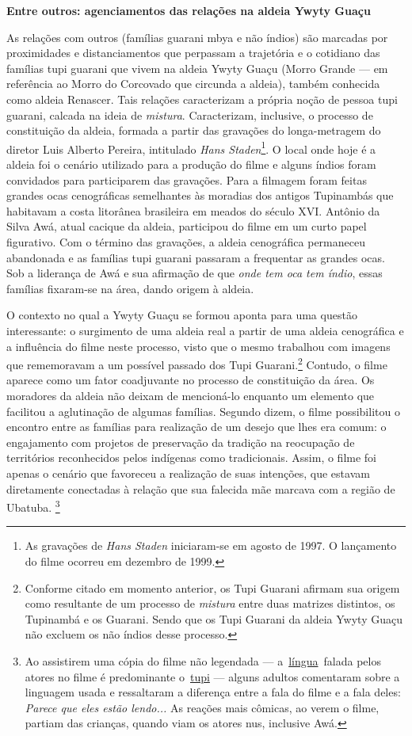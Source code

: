 \textbf{Entre outros: agenciamentos das relações na aldeia Ywyty Guaçu }

As relações com outros (famílias guarani mbya e não índios) são marcadas
por proximidades e distanciamentos que perpassam a trajetória e o
cotidiano das famílias tupi guarani que vivem na aldeia Ywyty Guaçu
(Morro Grande --- em referência ao Morro do Corcovado que circunda a
aldeia), também conhecida como aldeia Renascer. Tais relações
caracterizam a própria noção de pessoa tupi guarani, calcada na ideia de
\emph{mistura}. Caracterizam, inclusive, o processo de constituição da
aldeia, formada a partir das gravações do longa-metragem do diretor Luis
Alberto Pereira, intitulado \emph{Hans Staden}\footnote{As gravações de
  \emph{Hans Staden} iniciaram-se em agosto de 1997. O lançamento do
  filme ocorreu em dezembro de 1999.}. O local onde hoje é a aldeia foi
o cenário utilizado para a produção do filme e alguns índios foram
convidados para participarem das gravações. Para a filmagem foram feitas
grandes ocas cenográficas semelhantes às moradias dos antigos Tupinambás
que habitavam a costa litorânea brasileira em meados do século XVI.
Antônio da Silva Awá, atual cacique da aldeia, participou do filme em um
curto papel figurativo. Com o término das gravações, a aldeia
cenográfica permaneceu abandonada e as famílias tupi guarani passaram a
frequentar as grandes ocas. Sob a liderança de Awá e sua afirmação de
que \emph{onde tem oca tem índio}, essas famílias fixaram-se na área,
dando origem à aldeia.

O contexto no qual a Ywyty Guaçu se formou aponta para uma questão
interessante: o surgimento de uma aldeia real a partir de uma aldeia
cenográfica e a influência do filme neste processo, visto que o mesmo
trabalhou com imagens que rememoravam a um possível passado dos Tupi
Guarani.\footnote{Conforme citado em momento anterior, os Tupi Guarani
  afirmam sua origem como resultante de um processo de \emph{mistura}
  entre duas matrizes distintos, os Tupinambá e os Guarani. Sendo que os
  Tupi Guarani da aldeia Ywyty Guaçu não excluem os não índios desse
  processo.} Contudo, o filme aparece como um fator coadjuvante no
processo de constituição da área. Os moradores da aldeia não deixam de
mencioná-lo enquanto um elemento que facilitou a aglutinação de algumas
famílias. Segundo dizem, o filme possibilitou o encontro entre as
famílias para realização de um desejo que lhes era comum: o engajamento
com projetos de preservação da tradição na reocupação de territórios
reconhecidos pelos indígenas como tradicionais. Assim, o filme foi
apenas o cenário que favoreceu a realização de suas intenções, que
estavam diretamente conectadas à relação que sua falecida mãe marcava
com a região de Ubatuba. \footnote{Ao assistirem uma cópia do filme não
  legendada ---
  a~\href{http://pt.wikipedia.org/wiki/Língua}{língua}~falada pelos
  atores no filme é predominante
  o~\href{http://pt.wikipedia.org/wiki/Língua_tupi}{tupi} --- alguns
  adultos comentaram sobre a linguagem usada e ressaltaram a diferença
  entre a fala do filme e a fala deles: \emph{Parece que eles estão
  lendo...} As reações mais cômicas, ao verem o filme, partiam das
  crianças, quando viam os atores nus, inclusive Awá.}

